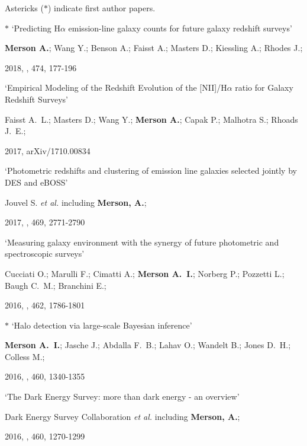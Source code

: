 Astericks ($\ast$) indicate first author papers.


\begin{etaremune}[leftmargin=15pt]
\item \label{itm:Merson2018}{\Large $\ast$} `Predicting H{$\alpha$} emission-line galaxy counts for future galaxy redshift surveys'\newline
  \begin{small}\textbf{Merson A.}; Wang Y.; Benson A.; Faisst A.; Masters D.; Kiessling A.; Rhodes J.;\end{small} 2018, \mnras, 474, 177-196

\item \label{itm:Faisst2017} `Empirical Modeling of the Redshift Evolution of the [NII]/H$\alpha$ ratio for Galaxy Redshift Surveys'\newline
  \begin{small}Faisst A.~L.; Masters D.; Wang Y.; \textbf{Merson A.}; Capak P.; Malhotra S.; Rhoads J.~E.;\end{small} 2017, arXiv/1710.00834

\item \label{itm:Jouvel2017} `Photometric redshifts and clustering of emission line galaxies selected jointly by DES and eBOSS'\newline
  \begin{small}Jouvel S. \textit{et al.} including \textbf{Merson, A.};\end{small} 2017, \mnras, 469, 2771-2790

\item \label{itm:Cucciati2016} `Measuring galaxy environment with the synergy of future photometric and spectroscopic surveys'\newline
  \begin{small}Cucciati O.; Marulli F.; Cimatti A.; \textbf{Merson A.~I.}; Norberg P.; Pozzetti L.; Baugh C.~M.; Branchini E.;\end{small} 2016, \mnras, 462, 1786-1801

\item \label{itm:Merson2016}{\Large $\ast$} `Halo detection via large-scale Bayesian inference'\newline
  \begin{small}\textbf{Merson A.~I.}; Jasche J.; Abdalla F.~B.; Lahav O.; Wandelt B.; Jones D.~H.; Colless M.;\end{small} 2016, \mnras, 460, 1340-1355

\item \label{itm:Dark2016} `The Dark Energy Survey: more than dark energy - an overview'\newline
  \begin{small}Dark Energy Survey Collaboration \textit{et al.} including \textbf{Merson, A.};\end{small} 2016, \mnras, 460, 1270-1299


\end{etaremune}
